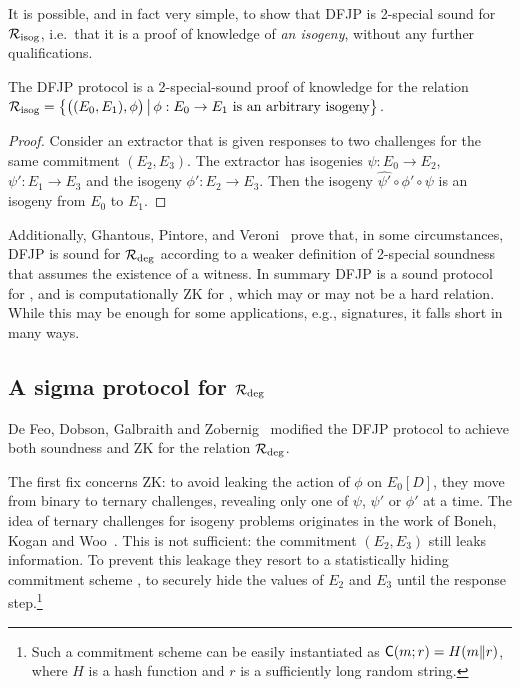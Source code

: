 It is possible, and in fact very simple, to show that DFJP is 2-special sound for $\R[isog]$, i.e.\ that it is a proof of knowledge of \emph{an isogeny}, without any further qualifications. 


\begin{lemma}
    The DFJP protocol is a 2-special-sound proof of knowledge for the relation
    $\R[isog]  = \bigl\{ \bigl((E_0, E_1),\phi \bigr) \,\big\vert\, \phi : E_0 \to E_1 \text{ is an arbitrary isogeny}\bigr\}$.
\end{lemma}
\begin{proof}
Consider an extractor that is given responses to two challenges for the same commitment $(E_2,E_3)$.
The extractor has isogenies  $\psi : E_0 \to E_2$,  $\psi' : E_1 \to E_3$ and the isogeny $\phi':E_2 \to E_3$.
Then the isogeny $\widehat{\psi'} \circ \phi' \circ \psi $ is an isogeny from $ E_0 $ to $E_1$.
\end{proof}

Additionally, Ghantous, Pintore, and Veroni~\cite{GPV21} prove that, in some circumstances, DFJP is sound for $\R[deg]$ according to a weaker definition of 2-special soundness that assumes the existence of a witness.
In summary DFJP is a sound protocol for \R[isog], and is computationally ZK for \R[M-SIDH], which may or may not be a hard relation.
While this may be enough for some applications, e.g., signatures, it falls short in many ways.


\subsection{A sigma protocol for $\R[deg]$}\label{sec:R-deg}

De Feo, Dobson, Galbraith and Zobernig~\cite{DFDGZ21} modified the DFJP protocol to achieve both soundness and ZK for the relation $\R[deg]$.

The first fix concerns ZK: to avoid leaking the action of $\phi$ on $E_0[D]$, they move from binary to ternary challenges, revealing only one of $\psi$, $\psi'$ or $\phi'$ at a time.
The idea of ternary challenges for isogeny problems originates in the work of Boneh, Kogan and Woo~\cite{BKW20}.
This is not sufficient: the commitment $(E_2,E_3)$ still leaks information.
To prevent this leakage they resort to a statistically hiding commitment scheme \Com, to securely hide the values of $E_2$ and $E_3$ until the response step.\footnote{Such a commitment scheme can be easily instantiated as $\Com(m;r) = H(m \Vert r)$, where $H$ is a hash function and $r$ is a sufficiently long random string.}

